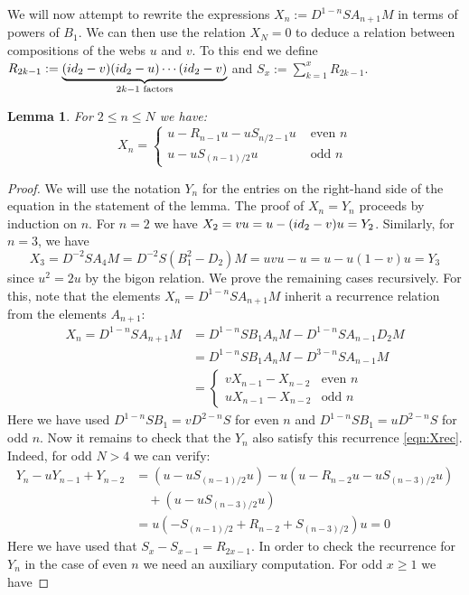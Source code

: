 \documentclass[11pt]{article}
\newtheorem{lemma}[theo]{Lemma}
\theoremstyle{definition}
\numberwithin{equation}{section}
\newcommand{\id}{{\rm id}}
\newcommand{\wrap}{D}
\begin{document}
We will now attempt to rewrite the expressions $X_n:=\wrap^{1-n} S A_{n+1} M$ in terms of powers of $B_1$. We can then use the relation $X_N=0$ to deduce a relation between compositions of the webs $u$ and $v$. 
To this end we define $R_{2k-1}:=\underbrace{(\id_2-v)(\id_2-u)\cdots (\id_2-v)}_{2k-1 \text{ factors}}$ and $S_x:=\sum_{k=1}^x R_{2k-1}$. 

\begin{lemma} \label{lem:XY}For $2\leq n \leq N$ we have:
\[X_n = \begin{cases} 
u - R_{n-1}u - u S_{n/2-1} u & \text{ even } n \\
u - u S_{(n-1)/2} u & \text{ odd } n
\end{cases}\]
\end{lemma}
\begin{proof} We will use the notation $Y_n$ for the entries on the right-hand side of the equation in the statement of the lemma. The proof of $X_n=Y_n$ proceeds by induction on $n$. For $n=2$ we have $X_2=v u = u-(\id_2-v)u = Y_2$. Similarly, for $n=3$, we have
\[ X_3=\wrap^{-2} S A_{4} M = \wrap^{-2} S (B_1^2-\wrap_2) M = uvu-u = u - u(1-v)u = Y_3\] since $u^2=2 u$ by the bigon relation. We prove the remaining cases recursively. For this, note that the elements $X_n=\wrap^{1-n} S A_{n+1} M$ inherit a recurrence relation from the elements $A_{n+1}$:
\begin{align}\label{eqn:Xrec}
X_n=\wrap^{1-n} S A_{n+1} M &= \wrap^{1-n} S B_1 A_{n} M - \wrap^{1-n} S A_{n-1} \wrap_2 M \\
\nonumber
&= \wrap^{1-n} S B_1 A_{n} M - \wrap^{3-n} S A_{n-1} M  \\
\nonumber
&= \begin{cases}
v X_{n-1} - X_{n-2} & \text{even } n\\
u X_{n-1} - X_{n-2} & \text{odd } n
\end{cases} 
\end{align}
Here we have used $\wrap^{1-n}SB_1=v \wrap^{2-n}S$ for even $n$ and $\wrap^{1-n}SB_1=u \wrap^{2-n} S$ for odd $n$. Now it remains to check that the $Y_n$ also satisfy this recurrence \eqref{eqn:Xrec}. Indeed, for odd $N>4$ we can verify:
\begin{align*}
  Y_n-uY_{n-1}+Y_{n-2} &= (u - u S_{(n-1)/2} u) - u(u - R_{n-2}u - u S_{(n-3)/2} u) \\
  &\quad + (u - u S_{(n-3)/2} u)\\
&=  u (-S_{(n-1)/2} + R_{n-2} + S_{(n-3)/2}) u =0
\end{align*}
Here we have used that $S_x-S_{x-1}= R_{2x-1}$. In order to check the recurrence for $Y_n$ in the case of even $n$ we need an auxiliary computation. For odd $x\geq 1$ we have

\end{proof}
\end{document}
